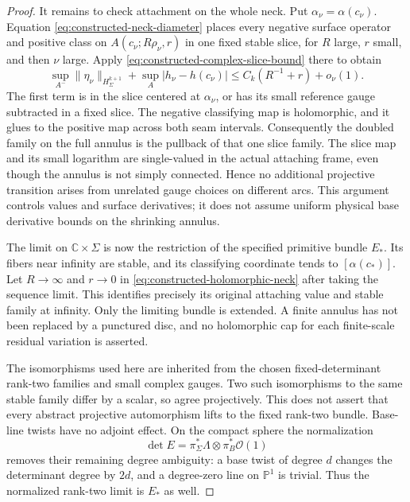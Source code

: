\documentclass[11pt]{amsart}
\theoremstyle{definition}
\theoremstyle{remark}
\theoremstyle{plain}
\newcommand{\CC}{\mathbb{C}}
\newcommand{\PP}{\mathbb{P}}
\newcommand{\cO}{\mathcal{O}}
\begin{document}
\begin{proof}
It remains to check attachment on the whole neck. Put
$\alpha_\nu=\alpha(c_\nu)$. Equation
\eqref{eq:constructed-neck-diameter} places every negative surface
operator and positive class on
$A(c_\nu;R\rho_\nu,r)$ in one fixed stable slice, for $R$ large,
$r$ small, and then $\nu$ large. Apply
\eqref{eq:constructed-complex-slice-bound} there to obtain
\begin{equation}\label{eq:constructed-holomorphic-neck}
 \sup_{A^-}\|\eta_\nu\|_{H^{k+1}_\Sigma}
       +\sup_A|h_\nu-h(c_\nu)|
                    \leq C_k(R^{-1}+r)+o_\nu(1).
\end{equation}
The first term is in the slice centered at $\alpha_\nu$, or has its
small reference gauge subtracted in a fixed slice. The negative
classifying map is holomorphic, and it glues to the positive map across
both seam intervals. Consequently the doubled family on the full
annulus is the pullback of that one slice family. The slice map and its
small logarithm are single-valued in the actual attaching frame, even
though the annulus is not simply connected. Hence no additional
projective transition arises from unrelated gauge choices on different
arcs. This argument controls values and surface derivatives; it does
not assume uniform physical base derivative bounds on the shrinking
annulus.

The limit on $\CC\times\Sigma$ is now the restriction of the specified
primitive bundle $E_*$. Its fibers near infinity are stable, and its
classifying coordinate tends to $[\alpha(c_*)]$. Let $R\to\infty$ and
$r\to0$ in \eqref{eq:constructed-holomorphic-neck} after taking the
sequence limit. This identifies precisely its original attaching value
and stable family at infinity. Only the limiting bundle is extended.
A finite annulus has not been replaced by a punctured disc, and no
holomorphic cap for each finite-scale residual variation is asserted.

The isomorphisms used here are inherited from the chosen fixed-determinant
rank-two families and small complex gauges. Two such isomorphisms to
the same stable family differ by a scalar, so agree projectively.
This does not assert that every abstract projective automorphism lifts
to the fixed rank-two bundle. Base-line twists have no adjoint effect.
On the compact sphere the normalization
\[
              \det E=\pi_\Sigma^*\Lambda\otimes\pi_B^*\cO(1)
\]
removes their remaining degree ambiguity: a base twist of degree $d$
changes the determinant degree by $2d$, and a degree-zero line on
$\PP^1$ is trivial. Thus the normalized rank-two limit is $E_*$ as well.
\end{proof}
\end{document}

